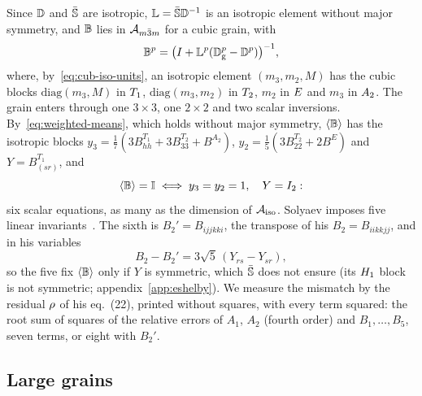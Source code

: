 Since $\mathbb{D}$ and $\bar{\mathbb{S}}$ are isotropic, $\mathbb L=\bar{\mathbb{S}}\mathbb{D}^{-1}$ is an isotropic element
without major symmetry, and $\mathbb{B}$ lies in $\mathcal{A}_{m\bar{3}m}$ for a cubic grain, with
\begin{equation}
\mathbb{B}^p=\big(I+\mathbb L^p(\mathbb{D}^p_{\mathrm{g}}-\mathbb{D}^p)\big)^{-1},\label{eq:sc-blocks}
\end{equation}
where, by~\eqref{eq:cub-iso-units}, an isotropic element $(m_3,m_2,M)$ has the cubic blocks
$\mathrm{diag}(m_3,M)$ in $T_1$, $\mathrm{diag}(m_3,m_2)$ in $T_2$, $m_2$ in
$E$ and $m_3$ in $A_2$. The grain enters through one $3\times3$, one $2\times2$
and two scalar inversions. By~\eqref{eq:weighted-means}, which holds without major
symmetry, $\langle \mathbb{B}\rangle$ has the isotropic blocks
$y_3=\tfrac17(3B^{T_1}_{hh}+3B^{T_2}_{33}+B^{A_2})$,
$y_2=\tfrac15(3B^{T_2}_{22}+2B^{E})$ and $Y=B^{T_1}_{(sr)}$, and
\begin{equation}
\langle \mathbb{B}\rangle=\mathbb{I}\iff y_3=y_2=1,\quad Y=I_2:\label{eq:sc-six}
\end{equation}
six scalar equations, as many as the dimension of $\mathcal{A}_{\mathrm{iso}}$. Solyaev imposes five
linear invariants~\cite[eq.~(13)]{Solyaev2023}. The sixth is $B_2'=B_{ijjkki}$, the
transpose of his $B_2=B_{iikkjj}$, and in his variables
\begin{equation}
B_2-B_2'=3\sqrt5\,(Y_{rs}-Y_{sr}),\label{eq:sc-sixth}
\end{equation}
so the five fix $\langle \mathbb{B}\rangle$ only if $Y$ is symmetric, which $\bar{\mathbb{S}}$ does not ensure (its
$H_{1}$ block is not symmetric; appendix~\ref{app:eshelby}). We measure the mismatch by the
residual $\rho$ of his eq.~(22), printed without squares, with every term squared: the
root sum of squares of the
relative errors of $A_1$, $A_2$ (fourth order) and $B_1,\dots,B_5$, seven terms, or eight
with $B_2'$.

\subsection{Large grains}\label{sec:application-limit}

